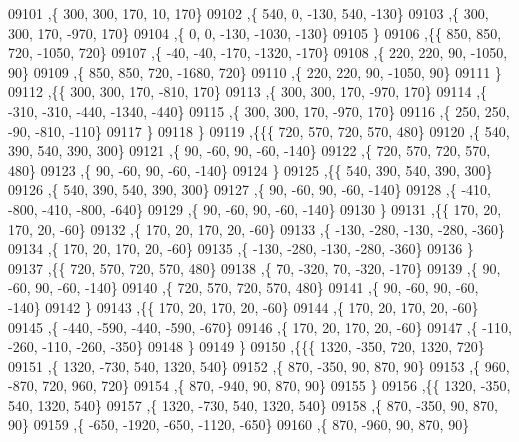\begin{DoxyCode}
09101     ,\{   300,   300,   170,    10,   170\}
09102     ,\{   540,     0,  -130,   540,  -130\}
09103     ,\{   300,   300,   170,  -970,   170\}
09104     ,\{     0,     0,  -130, -1030,  -130\}
09105     \}
09106    ,\{\{   850,   850,   720, -1050,   720\}
09107     ,\{   -40,   -40,  -170, -1320,  -170\}
09108     ,\{   220,   220,    90, -1050,    90\}
09109     ,\{   850,   850,   720, -1680,   720\}
09110     ,\{   220,   220,    90, -1050,    90\}
09111     \}
09112    ,\{\{   300,   300,   170,  -810,   170\}
09113     ,\{   300,   300,   170,  -970,   170\}
09114     ,\{  -310,  -310,  -440, -1340,  -440\}
09115     ,\{   300,   300,   170,  -970,   170\}
09116     ,\{   250,   250,   -90,  -810,  -110\}
09117     \}
09118    \}
09119   ,\{\{\{   720,   570,   720,   570,   480\}
09120     ,\{   540,   390,   540,   390,   300\}
09121     ,\{    90,   -60,    90,   -60,  -140\}
09122     ,\{   720,   570,   720,   570,   480\}
09123     ,\{    90,   -60,    90,   -60,  -140\}
09124     \}
09125    ,\{\{   540,   390,   540,   390,   300\}
09126     ,\{   540,   390,   540,   390,   300\}
09127     ,\{    90,   -60,    90,   -60,  -140\}
09128     ,\{  -410,  -800,  -410,  -800,  -640\}
09129     ,\{    90,   -60,    90,   -60,  -140\}
09130     \}
09131    ,\{\{   170,    20,   170,    20,   -60\}
09132     ,\{   170,    20,   170,    20,   -60\}
09133     ,\{  -130,  -280,  -130,  -280,  -360\}
09134     ,\{   170,    20,   170,    20,   -60\}
09135     ,\{  -130,  -280,  -130,  -280,  -360\}
09136     \}
09137    ,\{\{   720,   570,   720,   570,   480\}
09138     ,\{    70,  -320,    70,  -320,  -170\}
09139     ,\{    90,   -60,    90,   -60,  -140\}
09140     ,\{   720,   570,   720,   570,   480\}
09141     ,\{    90,   -60,    90,   -60,  -140\}
09142     \}
09143    ,\{\{   170,    20,   170,    20,   -60\}
09144     ,\{   170,    20,   170,    20,   -60\}
09145     ,\{  -440,  -590,  -440,  -590,  -670\}
09146     ,\{   170,    20,   170,    20,   -60\}
09147     ,\{  -110,  -260,  -110,  -260,  -350\}
09148     \}
09149    \}
09150   ,\{\{\{  1320,  -350,   720,  1320,   720\}
09151     ,\{  1320,  -730,   540,  1320,   540\}
09152     ,\{   870,  -350,    90,   870,    90\}
09153     ,\{   960,  -870,   720,   960,   720\}
09154     ,\{   870,  -940,    90,   870,    90\}
09155     \}
09156    ,\{\{  1320,  -350,   540,  1320,   540\}
09157     ,\{  1320,  -730,   540,  1320,   540\}
09158     ,\{   870,  -350,    90,   870,    90\}
09159     ,\{  -650, -1920,  -650, -1120,  -650\}
09160     ,\{   870,  -960,    90,   870,    90\}

\end{DoxyCode}
